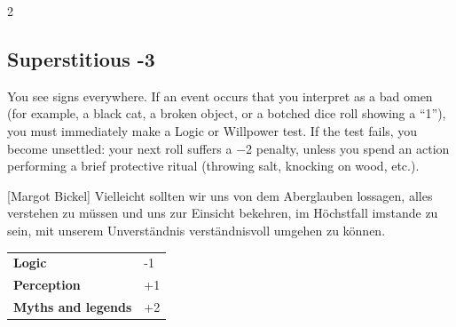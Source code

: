 \begin{multicols}{2}
\begin{tcolorbox}

\end{tcolorbox}

\begin{tcolorbox}
    \subsection*{Superstitious \hfill \small{-3 }}
    \tcblower
You see signs everywhere. If an event occurs that you interpret as a bad omen (for example, a black cat, a broken object, or a botched dice roll showing a “1”), you must immediately make a Logic or Willpower test. If the test fails, you become unsettled: your next roll suffers a −2 penalty, unless you spend an action performing a brief protective ritual (throwing salt, knocking on wood, etc.).

\begin{pquote}{[Margot Bickel]}
Vielleicht sollten wir uns von dem Aberglauben lossagen, alles verstehen zu müssen und uns zur Einsicht bekehren, im Höchstfall imstande zu sein, mit unserem Unverständnis verständnisvoll umgehen zu können.
\end{pquote}

\vspace{3mm}

\begin{tabular}{@{}ll@{}}
    \textbf{Logic} & -1\\
    \textbf{Perception} & +1\\
    \textbf{Myths and legends} & +2\\
\end{tabular}


\end{tcolorbox}


\end{multicols}
